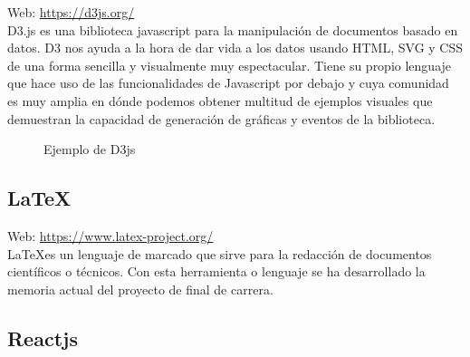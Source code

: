 Web: \url{https://d3js.org/}\\

D3.js es una biblioteca javascript para la manipulación de documentos basado en datos. D3 nos ayuda a la hora de dar vida a los datos usando HTML, SVG y CSS de una forma sencilla y visualmente muy espectacular. Tiene su propio lenguaje que hace uso de las funcionalidades de Javascript por debajo y cuya comunidad es muy amplia en dónde podemos obtener multitud de ejemplos visuales que demuestran la capacidad de generación de gráficas y eventos de la biblioteca.\\

\begin{figure}[H]
  \caption{Ejemplo de D3js}
\end{figure}


\subsection{\LaTeX}

Web: \url{https://www.latex-project.org/}\\

\LaTeX es un lenguaje de marcado que sirve para la redacción de documentos científicos o técnicos. Con esta herramienta o lenguaje se ha desarrollado la memoria actual del proyecto de final de carrera.

\subsection{Reactjs}

